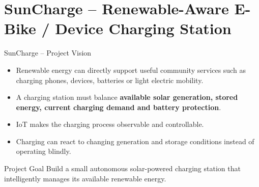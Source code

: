 \section[nosectionpage]{SunCharge -- Renewable-Aware E-Bike / Device Charging Station}

\begin{frame}{SunCharge -- Project Vision}
\begin{itemize}
    \item Renewable energy can directly support useful community services such as charging phones, devices, batteries or light electric mobility.
    \item A charging station must balance \textbf{available solar generation, stored energy, current charging demand and battery protection}.
    \item IoT makes the charging process observable and controllable.
    \item Charging can react to changing generation and storage conditions instead of operating blindly.
\end{itemize}

\begin{block}{Project Goal}
Build a small autonomous solar-powered charging station that intelligently manages its available renewable energy.
\end{block}
\end{frame}

